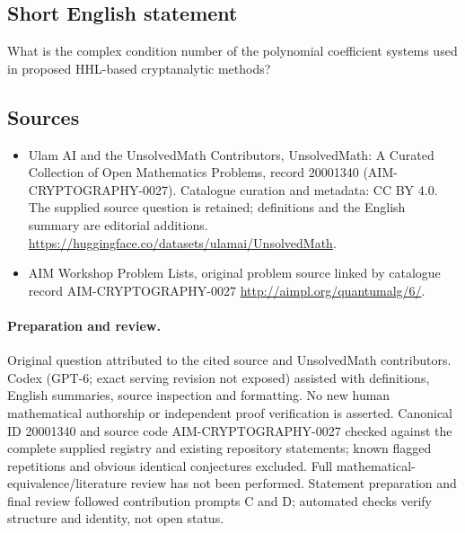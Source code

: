 \documentclass[11pt]{article}
\begin{document}
\subsection{Short English statement}
What is the complex condition number of the polynomial coefficient systems used in proposed HHL-based cryptanalytic methods?
\subsection{Sources}
\begin{itemize}
\item[\hypertarget{source:20001340:1}{S1}] Ulam AI and the UnsolvedMath Contributors, UnsolvedMath: A Curated Collection of Open Mathematics Problems, record 20001340 (AIM-CRYPTOGRAPHY-0027). Catalogue curation and metadata: CC BY 4.0. The supplied source question is retained; definitions and the English summary are editorial additions.
\url{https://huggingface.co/datasets/ulamai/UnsolvedMath}.
\item[\hypertarget{source:20001340:2}{S2}] AIM Workshop Problem Lists, original problem source linked by catalogue record AIM-CRYPTOGRAPHY-0027
\url{http://aimpl.org/quantumalg/6/}.
\end{itemize}
\paragraph{Preparation and review.}
Original question attributed to the cited source and UnsolvedMath contributors. Codex (GPT-6; exact serving revision not exposed) assisted with definitions, English summaries, source inspection and formatting. No new human mathematical authorship or independent proof verification is asserted. Canonical ID 20001340 and source code AIM-CRYPTOGRAPHY-0027 checked against the complete supplied registry and existing repository statements; known flagged repetitions and obvious identical conjectures excluded. Full mathematical-equivalence/literature review has not been performed. Statement preparation and final review followed contribution prompts C and D; automated checks verify structure and identity, not open status.
\label{end:20001340}
\end{document}
